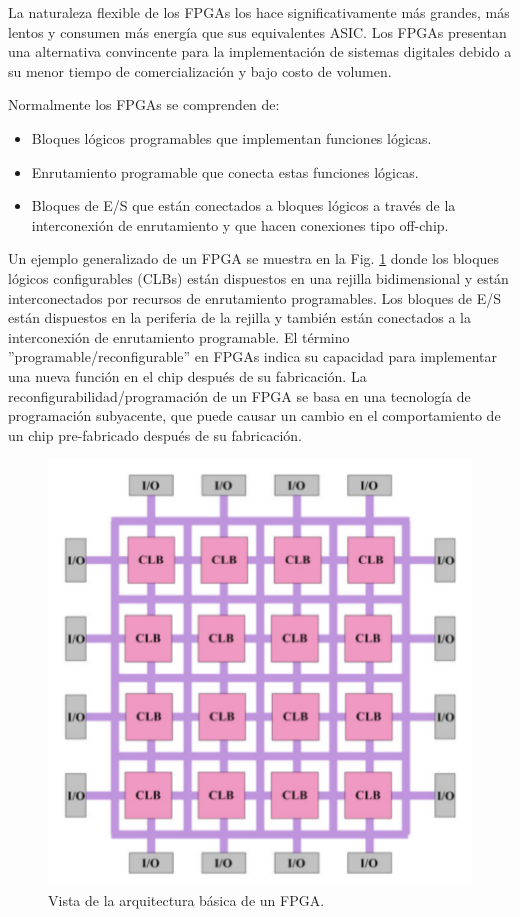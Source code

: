 \documentclass[12pt]{article}
\begin{document}
La naturaleza flexible de los FPGAs los hace significativamente más grandes, más lentos y consumen más energía que sus equivalentes ASIC. Los FPGAs presentan una alternativa convincente para la implementación de sistemas digitales debido a su menor tiempo de comercialización y bajo costo de volumen.

Normalmente los FPGAs se comprenden de:
 \begin{itemize}
   \item Bloques lógicos programables que implementan funciones lógicas.
   \item Enrutamiento programable que conecta estas funciones lógicas.
   \item Bloques de E/S que están conectados a bloques lógicos a través de la interconexión de enrutamiento y que hacen conexiones tipo off-chip.
 \end{itemize}

Un ejemplo generalizado de un FPGA se muestra en la Fig. \ref{fig:1} donde los bloques lógicos configurables (CLBs) están dispuestos en una rejilla bidimensional y están interconectados por recursos de enrutamiento programables. Los bloques de E/S están dispuestos en la periferia de la rejilla y también están conectados a la interconexión de enrutamiento programable. El término ''programable/reconfigurable'' en FPGAs indica su capacidad para implementar una nueva función en el chip después de su fabricación. La reconfigurabilidad/programación de un FPGA se basa en una tecnología de programación subyacente, que puede causar un cambio en el comportamiento de un chip pre-fabricado después de su fabricación.


\begin{figure}[H]
  \centering
  \includegraphics[]{1-Overview-of-FPGA-architecture.png}
  \caption{Vista de la arquitectura básica de un FPGA.}
  \label{fig:1}
\end{figure}
\end{document}
